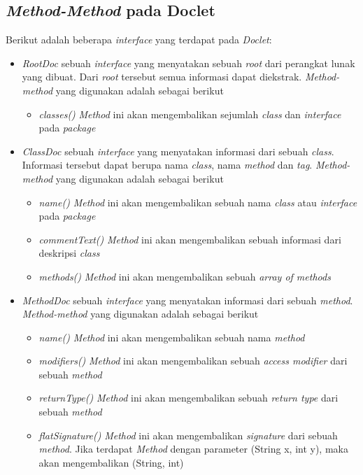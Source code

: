 \subsection{\textit{Method-Method} pada Doclet}
\label{sec:method-doclet}
Berikut adalah beberapa {\it interface} yang terdapat pada {\it Doclet}:
\begin{itemize}
	\item {\it RootDoc}
	sebuah {\it interface} yang menyatakan sebuah {\it root} dari perangkat lunak yang dibuat. Dari {\it root} tersebut semua informasi dapat diekstrak. {\it Method-method} yang digunakan adalah sebagai berikut
	\begin{itemize}
		\item {\it classes()}
		{\it Method} ini akan mengembalikan sejumlah {\it class} dan {\it interface} pada {\it package}
	\end{itemize}
	\item {\it ClassDoc}
	sebuah {\it interface} yang menyatakan informasi dari sebuah {\it class}. Informasi tersebut dapat berupa nama {\it class}, nama {\it method} dan {\it tag}. {\it Method-method} yang digunakan adalah sebagai berikut
	\begin{itemize}
		\item {\it name()}
		{\it Method} ini akan mengembalikan sebuah nama {\it class} atau {\it interface} pada {\it package}
		\item {\it commentText()}
		{\it Method} ini akan mengembalikan sebuah informasi dari deskripsi {\it class}
		\item {\it methods()}
		{\it Method} ini akan mengembalikan sebuah {\it array of methods} 
	\end{itemize}
	\item {\it MethodDoc}
	sebuah {\it interface} yang menyatakan informasi dari sebuah {\it method}. {\it Method-method} yang digunakan adalah sebagai berikut
	\begin{itemize}
		\item {\it name()}
		{\it Method} ini akan mengembalikan sebuah nama {\it method}
		\item {\it modifiers()}
		{\it Method} ini akan mengembalikan sebuah {\it access modifier} dari sebuah {\it method}
		\item {\it returnType()}
		{\it Method} ini akan mengembalikan sebuah {\it return type} dari sebuah {\it method}
		\item {\it flatSignature()}
		{\it Method} ini akan mengembalikan {\it signature} dari sebuah {\it method}. Jika terdapat {\it Method} dengan parameter (String x, int y), maka akan mengembalikan (String, int)

\end{itemize}
\end{itemize}
